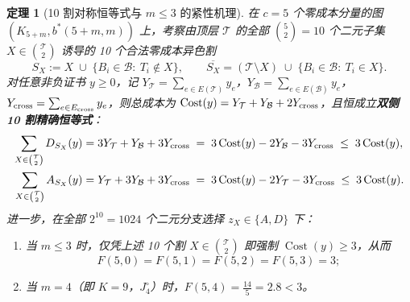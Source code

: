 \documentclass[11pt,a4paper]{ctexart}
\newtheorem{theorem}{定理}[section]
\theoremstyle{definition}
\newcommand{\1}{\boldsymbol 1}
\newcommand{\0}{\boldsymbol 0}
\begin{document}
\begin{theorem}[10 割对称恒等式与 $m\le 3$ 的紧性机理]\label{thm:10_cuts_F53}
在 $c=5$ 个零成本分量的图 $(K_{5+m},b^*(5+m,m))$ 上，考察由顶层 $\mathcal T$ 的全部 $\binom{5}{2}=10$ 个二元子集 $X\in\binom{\mathcal T}{2}$ 诱导的 10 个合法零成本异色割
\[
 S_X := X \;\cup\; \bigl\{B_i\in\mathcal B:\ T_i\notin X\bigr\},\qquad
 \overline{S_X} = (\mathcal T\setminus X) \;\cup\; \bigl\{B_i\in\mathcal B:\ T_i\in X\bigr\}.
\]
对任意非负证书 $y\ge 0$，记 $Y_{\mathcal T}=\sum_{e\in E(\mathcal T)}y_e$，$Y_{\mathcal B}=\sum_{e\in E(\mathcal B)}y_e$，$Y_{\rm cross}=\sum_{e\in E_{\rm cross}}y_e$，则总成本为 $\operatorname{Cost}(y)=Y_{\mathcal T}+Y_{\mathcal B}+2Y_{\rm cross}$，且恒成立\textbf{双侧 10 割精确恒等式}：
\begin{align}
 \sum_{X\in\binom{\mathcal T}{2}} D_{S_X}(y) &= 3Y_{\mathcal T} + Y_{\mathcal B} + 3Y_{\rm cross} \;=\; 3\operatorname{Cost}(y) - 2Y_{\mathcal B} - 3Y_{\rm cross} \;\le\; 3\operatorname{Cost}(y),\label{eq:10cut_D}\\
 \sum_{X\in\binom{\mathcal T}{2}} A_{S_X}(y) &= Y_{\mathcal T} + 3Y_{\mathcal B} + 3Y_{\rm cross} \;=\; 3\operatorname{Cost}(y) - 2Y_{\mathcal T} - 3Y_{\rm cross} \;\le\; 3\operatorname{Cost}(y).\label{eq:10cut_A}
\end{align}
进一步，在全部 $2^{10}=1024$ 个二元分支选择 $z_X\in\{A,D\}$ 下：
\begin{enumerate}[label=(\alph*)]
\item 当 \textbf{$m\le 3$} 时，仅凭上述 10 个割 $X\in\binom{\mathcal T}{2}$ 即强制 $\operatorname{Cost}(y)\ge 3$，从而
\begin{equation}\label{eq:F5m_eq_3}
 \boxed{F(5,0)=F(5,1)=F(5,2)=F(5,3)=3;}
\end{equation}
\item 当 \textbf{$m=4$}（即 $K=9$，$J_4^\circ$）时，$F(5,4)=\frac{14}{5}=2.8<3$。
\end{enumerate}
\end{theorem}
\end{document}
